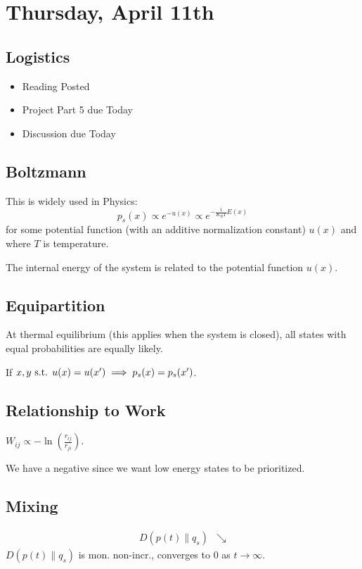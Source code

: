 \section{Thursday, April 11th}
\subsection{Logistics}
\begin{itemize}
    \item Reading Posted
    \item Project Part 5 due Today
    \item Discussion due Today
\end{itemize}

\subsection{Boltzmann}
This is widely used in Physics:
\begin{equation}
p_s(x) \propto e^{-u(x)} \propto e^{-\frac1{K_B T} E(x)}
\end{equation}
for some potential function (with an additive normalization constant) $u(x)$ and where $T$ is temperature.

The internal energy of the system is related to the potential function $u(x)$.

\subsection{Equipartition}
At thermal equilibrium (this applies when the system is closed), all states with equal probabilities are equally likely.

If $x, y\text{ s.t. } u(x)=u(x')\implies p_s(x)=p_s(x')$.

\subsection{Relationship to Work}
$W_{ij} \propto -\ln(\frac{r_{ij}}{r_{ji}})$.

We have a negative since we want low energy states to be prioritized.

\subsection{Mixing}
\begin{align}
    D(p(t)\| q_{s}) &\searrow
\end{align}
$D(p(t)\| q_{s})$ is mon. non-incr., converges to 0 as $t\to\infty$.

